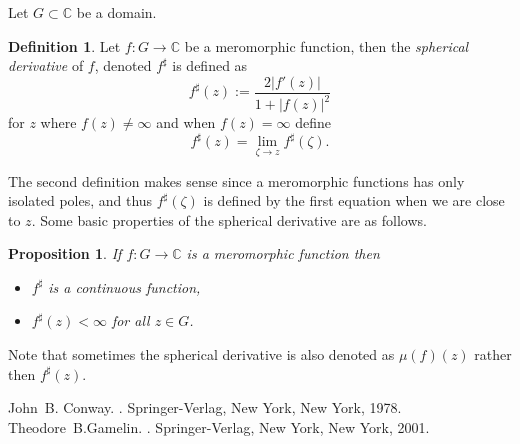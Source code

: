 \documentclass[12pt]{article}
\theoremstyle{theorem}
\newtheorem*{prop}{Proposition}
\theoremstyle{definition}
\newtheorem*{defn}{Definition}
\theoremstyle{remark}
\begin{document}
Let $G \subset {\mathbb{C}}$ be a domain.

\begin{defn}
Let $f \colon G \to {\mathbb{C}}$ be a meromorphic function, then the {\em spherical
derivative} of $f$, denoted $f^\sharp$ is defined as
\begin{equation*}
f^\sharp(z) := \frac{2\lvert f'(z) \rvert}{1+\lvert f(z) \rvert^2}
\end{equation*}
for $z$ where $f(z) \not= \infty$ and when $f(z) = \infty$ define
\begin{equation*}
f^\sharp(z) = \lim_{\zeta \to z} f^\sharp(\zeta) .
\end{equation*}
\end{defn}

The second definition makes sense since a meromorphic functions has
only isolated poles, and thus $f^\sharp(\zeta)$ is defined by the first equation when we are close to $z$.  Some basic properties of the spherical derivative
are as follows.

\begin{prop}
If $f \colon G \to {\mathbb{C}}$ is a meromorphic function
then
\begin{itemize}
\item $f^\sharp$ is a continuous function,
\item $f^\sharp(z) < \infty$ for all $z \in G$. 
\end{itemize}
\end{prop}

Note that sometimes the spherical derivative is also denoted
as $\mu(f)(z)$ rather then $f^\sharp(z)$.

\begin{thebibliography}{9}
John~B. Conway.
{\em {}}.
Springer-Verlag, New York, New York, 1978.
Theodore~B.\@ Gamelin.
{\em {}}.
Springer-Verlag, New York, New York, 2001.
\end{thebibliography}
\end{document}
